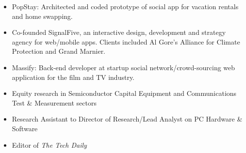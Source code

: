 \documentclass[a4paper,10pt]{memoir} %
\begin{document}
\clearpage %
\userinformation %
\framebreak %


\begin{itemize}
	\item PopStay: Architected and coded prototype of social app for vacation rentals and home swapping.
	\item Co-founded SignalFive, an interactive design, development and strategy agency for web/mobile apps. Clients included Al Gore's Alliance for Climate Protection and Grand Marnier. 
	\item Massify: Back-end developer at startup social network/crowd-sourcing web application for the film and TV industry.
\end{itemize}
\Sep %


\begin{itemize}
	\item Equity research in Semiconductor Capital Equipment and Communications Test \& Measurement sectors
\end{itemize}
\Sep %

\begin{itemize}
	\item Research Assistant to Director of Research/Lead Analyst on PC Hardware \& Software 
	\item Editor of \textit{The Tech Daily}
\end{itemize}

\Sep %



\end{document}
